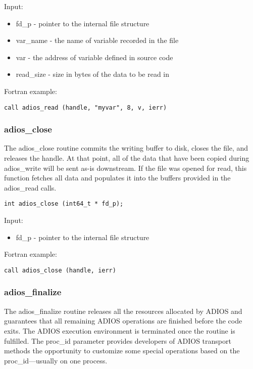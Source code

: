 Input:

\begin{itemize}
\item fd\_p - pointer to the internal file structure
\item var\_name - the name of variable recorded in the file
\item var - the address of variable defined in source code
\item read\_size -  size in bytes of the data to be read in 
\end{itemize}

Fortran example: 
\begin{lstlisting}[alsolanguage=Fortran,caption={},label={}]
call adios_read (handle, "myvar", 8, v, ierr)
\end{lstlisting}

\subsubsection{adios\_close}

The adios\_close routine commits the writing buffer to disk, closes 
the file, and releases the handle. At that point, all of the data that have been 
copied during adios\_write will be sent as-is downstream. If the file was opened 
for read, this function fetches all data and populates it into the 
buffers provided in the adios\_read calls. 

\begin{lstlisting}[alsolanguage=C,caption={},label={}]
int adios_close (int64_t * fd_p);
\end{lstlisting}

Input: 
\begin{itemize}
\item fd\_p - pointer to the internal file structure
\end{itemize}

Fortran example: 
\begin{lstlisting}[alsolanguage=Fortran,caption={},label={}]
call adios_close (handle, ierr)
\end{lstlisting}

\subsubsection{adios\_finalize}

The adios\_finalize routine releases all the resources allocated by ADIOS and guarantees 
that all remaining ADIOS operations are finished before the code exits. The ADIOS 
execution environment is terminated once the routine is fulfilled. The proc\_id 
parameter provides developers of ADIOS transport methods the opportunity to customize 
some special operations based on the proc\_id---usually on one process. 


